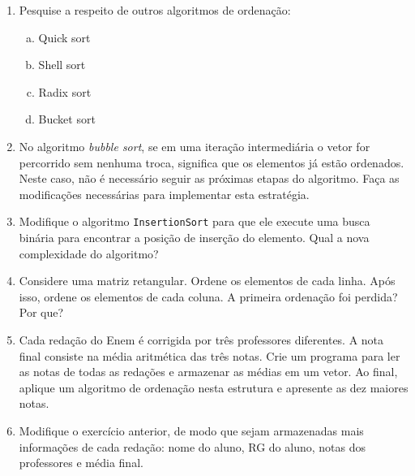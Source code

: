 \begin{enumerate}
	\item Pesquise a respeito de outros algoritmos de ordenação:
	\begin{enumerate}[a.]
		\item Quick sort
		\item Shell sort
		\item Radix sort
		\item Bucket sort
	\end{enumerate}
	
	\item No algoritmo \textit{bubble sort}, se em uma iteração intermediária o vetor for percorrido sem nenhuma troca, significa que os elementos já estão ordenados. Neste caso, não é necessário seguir as próximas etapas do algoritmo. Faça as modificações necessárias para implementar esta estratégia.
	
	\item Modifique o algoritmo \texttt{InsertionSort} para que ele execute uma busca binária para encontrar a posição de inserção do elemento. Qual a nova complexidade do algoritmo?
	
	\item Considere uma matriz retangular. Ordene os elementos de cada linha. Após isso, ordene os elementos de cada coluna. A primeira ordenação foi perdida? Por que?
	
	\item Cada redação do Enem é corrigida por três professores diferentes. A nota final consiste na média aritmética das três notas. Crie um programa para ler as notas de todas as redações e armazenar as médias em um vetor. Ao final, aplique um algoritmo de ordenação nesta estrutura e apresente as dez maiores notas.
	
	\item Modifique o exercício anterior, de modo que sejam armazenadas mais informações de cada redação: nome do aluno, RG do aluno, notas dos professores e média final.
\end{enumerate}

\medskip

\begingroup
	\footnotesize
	\renewcommand{\chapter}[2]{}%
	
	
\endgroup


